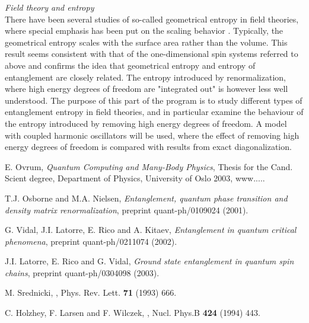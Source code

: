 \noindent
{\em Field theory and entropy}\\
There have been several studies of so-called geometrical entropy in field
theories, where special emphasis has been put on the scaling behavior
\cite{Srednicki, Holzhey}. Typically, the geometrical entropy scales with the
surface area rather than the volume. This result seems consistent
with that of the
one-dimensional spin systems referred to above and confirms the idea that
geometrical entropy and entropy of entanglement are closely related.
The entropy
introduced by renormalization, where high energy degrees of freedom are
"integrated out" is however less well understood. The purpose of this
part of the
program is to study different types of entanglement entropy in field
theories, and
in particular examine the behaviour of the entropy introduced by removing high
energy degrees of freedom. A model with coupled harmonic oscillators
will be used,
where the effect of removing high energy degrees of freedom is compared with
results from exact diagonalization.


\begin{thebibliography}{99}


 E. Ovrum, {\em Quantum Computing and Many-Body
Physics}, Thesis
for the Cand. Scient degree, Department of Physics, University of Oslo 2003,
www.....

T.J. Osborne and M.A. Nielsen, {\em Entanglement, quantum phase transition and
density matrix renormalization}, preprint quant-ph/0109024 (2001).

G. Vidal, J.I. Latorre, E. Rico and A. Kitaev, {\em Entanglement in quantum
critical phenomena}, preprint quant-ph/0211074 (2002).

J.I. Latorre, E. Rico and G. Vidal, {\em Ground state entanglement in quantum
spin chains}, preprint quant-ph/0304098 (2003).

M. Srednicki, {\em }, Phys. Rev. Lett. {\bf 71} (1993) 666.

C. Holzhey, F. Larsen and F. Wilczek, {\em }, Nucl. Phys.B {\bf 424}
(1994) 443.


\end{thebibliography}



